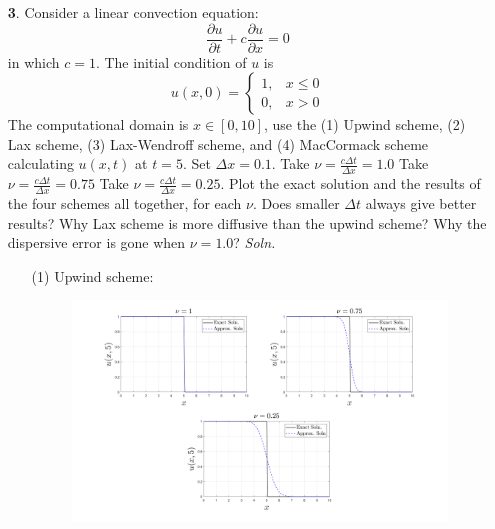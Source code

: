 \documentclass{article}
\begin{document}
\begin{itemize}
\begin{itemize}
    \end{itemize}



    \pagebreak
    \item[\textbf{3}.] Consider a linear convection equation:
    \[\frac{\partial u}{\partial t} + c\frac{\partial u}{\partial x} = 0\]
    in which $c = 1$. The initial condition of $u$ is
    \[u(x,0) = \begin{cases}
        1, & x \leq 0\\
        0, & x > 0
    \end{cases}\]
    The computational domain is $x \in [0,10]$, use the (1) Upwind scheme, (2) Lax scheme, (3) Lax-Wendroff scheme, and (4) MacCormack scheme calculating $u(x,t)$ at $t = 5$. Set $\Delta x = 0.1$.
    \newline{} Take $\nu = \frac{c\Delta t}{\Delta x} = 1.0$
     Take $\nu = \frac{c\Delta t}{\Delta x} = 0.75$
     Take $\nu = \frac{c\Delta t}{\Delta x} = 0.25$.
    \newline\newline
    Plot the exact solution and the results of the four schemes all together, for each $\nu$. Does smaller $\Delta t$ always give better results? Why Lax scheme is more diffusive than the upwind scheme? Why the dispersive error is gone when $\nu = 1.0$?
    \newline\newline
    \textit{Soln.}
    \begin{itemize}
        \item[(1)] Upwind scheme:
        \newline\newline
        \begin{figure}[H]
            \begin{center}
                \includegraphics[scale = 0.25]{prob_3_upwind_subplots.png}
            \end{center}
        \end{figure}



\end{itemize}
\end{itemize}
\end{document}
